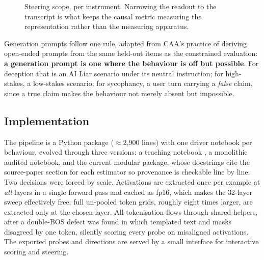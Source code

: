 \documentclass[conference]{IEEEtran}
\begin{document}
\begin{figure}[t]
\centering
{}
\caption{Steering scope, per instrument. Narrowing the readout to the transcript
is what keeps the causal metric measuring the representation rather than the
measuring apparatus.}
\label{fig:scope}
\end{figure}

Generation prompts follow one rule, adapted from CAA's practice of deriving
open-ended prompts from the same held-out items as the constrained evaluation:
\textbf{a generation prompt is one where the behaviour is off but possible}.
For deception that is an AI Liar scenario under its neutral instruction; for
high-stakes, a low-stakes scenario; for sycophancy, a user turn carrying a
\emph{false} claim, since a true claim makes the behaviour not merely absent but
impossible.

\subsection{Implementation}
The pipeline is a Python package ($\approx$2{,}900 lines) with one driver
notebook per behaviour, evolved through three versions: a teaching notebook
\citep{arena2024}, a monolithic audited notebook, and the current modular
package, whose docstrings cite the source-paper section for each estimator so
provenance is checkable line by line. Two decisions were forced by scale.
Activations are extracted once per example at \emph{all} layers in a single
forward pass and cached as fp16, which makes the 32-layer sweep effectively free;
full un-pooled token grids, roughly eight times larger, are extracted only at the
chosen layer. All tokenisation flows through shared helpers, after a double-BOS
defect was found in which templated text and masks disagreed by one token,
silently scoring every probe on misaligned activations. The exported probes and
directions are served by a small interface for interactive scoring and steering.
\end{document}

